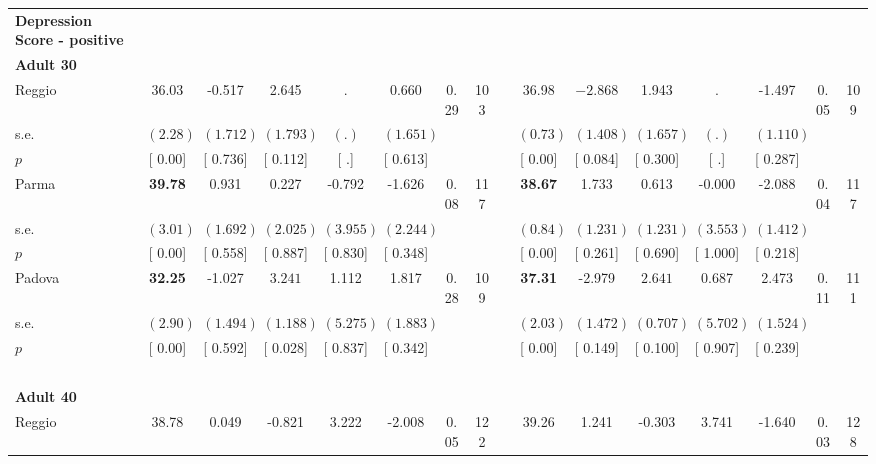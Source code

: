 \begin{longtable}{L{8em} c c c c c c c p{1em} c c c c c c c}
\textbf{Depression Score - positive} \\*
\quad \quad \textbf{Adult 30} & & & & & & & & & & & & & & & \\* 
\quad \quad \quad Reggio& 36.03 &    -0.517 &     2.645 &         . &     0.660 &      0.29 &       103 & & 36.98 & $ \mathbf{   -2.868}$ &     1.943 &         . &    -1.497 &      0.05 &       109  \\*
\quad \quad \quad \quad s.e.& $ (     2.28)$ & $ (    1.712)$ & $ (    1.793)$ & $ (        .)$ & $ (    1.651)$ & & & & $ (     0.73)$ & $ (    1.408)$ & $ (    1.657)$ & $ (        .)$ & $ (    1.110)$ & &  \\*
\quad \quad \quad \quad $ p$ & [     0.00] & [    0.736] & [    0.112] & [        .] & [    0.613] & & & & [     0.00] & [    0.084] & [    0.300] & [        .] & [    0.287] & &  \\[1em]
\quad \quad \quad Parma& \textbf{    39.78} &     0.931 &     0.227 &    -0.792 &    -1.626 &      0.08 &       117 & & \textbf{    38.67} &     1.733 &     0.613 &    -0.000 &    -2.088 &      0.04 &       117  \\*
\quad \quad \quad \quad s.e.& $ (     3.01)$ & $ (    1.692)$ & $ (    2.025)$ & $ (    3.955)$ & $ (    2.244)$ & & & & $ (     0.84)$ & $ (    1.231)$ & $ (    1.231)$ & $ (    3.553)$ & $ (    1.412)$ & &  \\*
\quad \quad \quad \quad $ p$ & [     0.00] & [    0.558] & [    0.887] & [    0.830] & [    0.348] & & & & [     0.00] & [    0.261] & [    0.690] & [    1.000] & [    0.218] & &  \\[1em]
\quad \quad \quad Padova& \textbf{    32.25} &    -1.027 & $ \mathbf{    3.241}$ &     1.112 &     1.817 &      0.28 &       109 & & \textbf{    37.31} &    -2.979 & $ \mathbf{    2.641}$ &     0.687 &     2.473 &      0.11 &       111  \\*
\quad \quad \quad \quad s.e.& $ (     2.90)$ & $ (    1.494)$ & $ (    1.188)$ & $ (    5.275)$ & $ (    1.883)$ & & & & $ (     2.03)$ & $ (    1.472)$ & $ (    0.707)$ & $ (    5.702)$ & $ (    1.524)$ & &  \\*
\quad \quad \quad \quad $ p$ & [     0.00] & [    0.592] & [    0.028] & [    0.837] & [    0.342] & & & & [     0.00] & [    0.149] & [    0.100] & [    0.907] & [    0.239] & &  \\[1em]
~\\[1em]
\quad \quad \textbf{Adult 40} & & & & & & & & & & & & & & & \\* 
\quad \quad \quad Reggio& 38.78 &     0.049 &    -0.821 &     3.222 &    -2.008 &      0.05 &       122 & & 39.26 &     1.241 &    -0.303 &     3.741 &    -1.640 &      0.03 &       128  \\*

\end{longtable}
